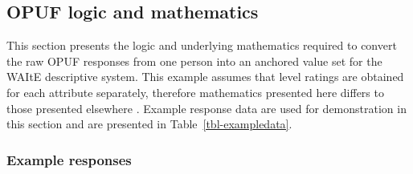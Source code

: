 \documentclass[
  number,
  preprint]{elsarticle}
\begin{document}
\subsection{OPUF logic and mathematics}\label{sec-OPUF_methods}

This section presents the logic and underlying mathematics required to
convert the raw OPUF responses from one person into an anchored value
set for the WAItE descriptive system. This example assumes that level
ratings are obtained for each attribute separately, therefore
mathematics presented here differs to those presented elsewhere
\citep{Schneider2022TheStates}. Example response data are used for
demonstration in this section and are presented in
Table~\ref{tbl-exampledata}.

\subsubsection{Example responses}\label{example-responses}
\end{document}
